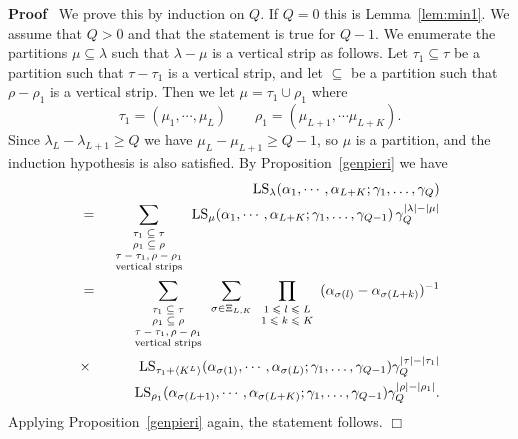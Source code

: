 \documentclass[11pt]{amsart}
\newcommand{\tmop}[1]{\ensuremath{\operatorname{#1}}}
\renewenvironment{proof}{
\noindent\textbf{Proof}\ }{\hspace*{\fill}
\begin{math}\Box\end{math}\medskip}
\newcommand{\tmscript}[1]{\text{\scriptsize $#1$}}
\begin{document}
\begin{proof}
We prove this by induction on $Q$. If $Q = 0$ this is
Lemma~\ref{lem:min1}. We assume that $Q > 0$ and that the
statement is true for $Q - 1$. We enumerate the partitions $\mu
\subseteq \lambda$ such that $\lambda - \mu$ is a vertical strip
as follows. Let $\tau_1 \subseteq \tau$ be a partition such that
$\tau - \tau_1$ is a vertical strip, and let $\subseteq$ be a
partition such that $\rho - \rho_1$ is a vertical strip. Then we
let $\mu = \tau_1 \cup \rho_1$ where
\[ \tau_1 = ( \mu_1, \cdots, \mu_L ) \hspace{2em} \rho_1 = ( \mu_{L + 1},
    \cdots \mu_{L + K} ) . \]
Since $\lambda_L - \lambda_{L + 1} \geqslant Q$ we have $\mu_L -
\mu_{L + 1} \geqslant Q - 1$, so $\mu$ is a partition, and the
induction hypothesis is also satisfied. By
Proposition~\ref{genpieri} we have
\begin{eqnarray*}
   &  & \tmop{LS}_{\lambda} ( \alpha_1, \cdots, \alpha_{L + K} ; \gamma_1,
   \ldots, \gamma_Q )\\
   & = & \sum_{\tmscript{\begin{array}{c}
     \tau_1 \subseteq \tau\\
     \rho_1 \subseteq \rho\\
     \tau - \tau_1, \rho - \rho_1\\
     \text{vertical strips}
   \end{array}}} \tmop{LS}_{\mu} ( \alpha_1, \cdots, \alpha_{L + K} ;
   \gamma_1, \ldots, \gamma_{Q - 1} ) \, \gamma_Q^{| \lambda | - | \mu |}\\
   & = & \sum_{\tmscript{\begin{array}{c}
     \tau_1 \subseteq \tau\\
     \rho_1 \subseteq \rho\\
     \tau - \tau_1, \rho - \rho_1\\
     \text{vertical strips}
   \end{array}}} \sum_{\sigma \in \Xi_{L, K}}
   \prod_{\tmscript{\begin{array}{c}
     1 \leqslant l \leqslant L\\
     1 \leqslant k \leqslant K
   \end{array}}} ( \alpha_{\sigma ( l )} - \alpha_{\sigma ( L + k )} )^{-
   1}\\
   & \times & \tmop{LS}_{\tau_1 + \left\langle K^L \right\rangle} (
   \alpha_{\sigma ( 1 )}, \cdots, \alpha_{\sigma ( L )} ; \gamma_1, \ldots,
   \gamma_{Q - 1} ) \gamma_Q^{| \tau | - | \tau_1 |}\\
   &  & \tmop{LS}_{\rho_1} ( \alpha_{\sigma ( L + 1 )}, \cdots,
   \alpha_{\sigma ( L + K )} ; \gamma_1, \ldots, \gamma_{Q - 1} ) \gamma_Q^{|
   \rho | - | \rho_1 |} .
\end{eqnarray*}
Applying Proposition~\ref{genpieri} again, the statement follows.
\end{proof}
\end{document}

